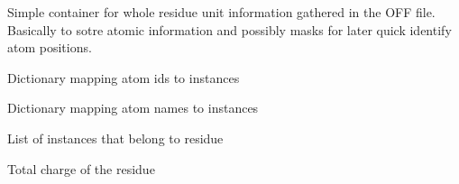 \documentclass[letterpaper,10pt,english]{sphinxmanual}
\begin{document}

\begin{fulllineitems}
\label{containers:pyMDMix.containers.Residue}
Simple container for whole residue unit information gathered in the OFF file.
Basically to sotre atomic information and possibly masks for later quick identify atom
positions.

\begin{fulllineitems}
\label{containers:pyMDMix.containers.Residue.atids}
Dictionary mapping atom ids to {\hyperref[containers:pyMDMix.containers.Atom]{}} instances

\end{fulllineitems}


\begin{fulllineitems}
\label{containers:pyMDMix.containers.Residue.atnames}
Dictionary mapping atom names to {\hyperref[containers:pyMDMix.containers.Atom]{}} instances

\end{fulllineitems}


\begin{fulllineitems}
\label{containers:pyMDMix.containers.Residue.atoms}
List of {\hyperref[containers:pyMDMix.containers.Atom]{}} instances that belong to residue

\end{fulllineitems}


\begin{fulllineitems}
\label{containers:pyMDMix.containers.Residue.charge}
Total charge of the residue

\end{fulllineitems}



\end{fulllineitems}
\end{document}
